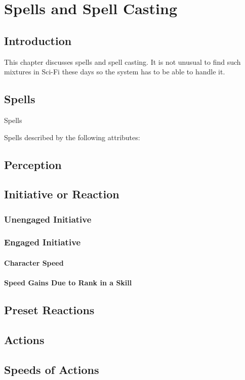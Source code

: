 \chapter{Spells and Spell Casting}

\section{Introduction}

This chapter discusses spells and spell casting. It is not unusual to
find such mixtures in Sci-Fi these days so the system has to be able to 
handle it. 

\section{Spells}
{Spells}

Spells described by the following attributes:

\section{Perception}
\section{Initiative or Reaction}
\subsection{Unengaged Initiative}
\subsection{Engaged Initiative}
\subsubsection{Character Speed}
\subsubsection{Speed Gains Due to Rank in a Skill}
\section{Preset Reactions}
\section{Actions}
\section{Speeds of Actions}
